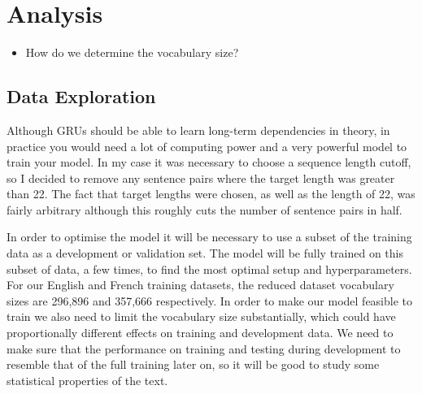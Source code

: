 \documentclass[]{article}
\begin{document}
\section{Analysis}
\begin{itemize}
	\item How do we determine the vocabulary size?
\end{itemize}
\subsection{Data Exploration}
Although GRUs should be able to learn long-term dependencies in theory, in practice you would need a lot of computing power and a very powerful model to train your model. In my case it was necessary to choose a sequence length cutoff, so I decided to remove any sentence pairs where the target length was greater than 22. The fact that target lengths were chosen, as well as the length of 22, was fairly arbitrary although this roughly cuts the number of sentence pairs in half.

In order to optimise the model it will be necessary to use a subset of the training data as a development or validation set. The model will be fully trained on this subset of data, a few times, to find the most optimal setup and hyperparameters. For our English and French training datasets, the reduced dataset vocabulary sizes are 296,896 and 357,666 respectively. In order to make our model feasible to train we also need to limit the vocabulary size substantially, which could have proportionally different effects on training and development data. We need to make sure that the performance on training and testing during development to resemble that of the full training later on, so it will be good to study some statistical properties of the text.
\end{document}
